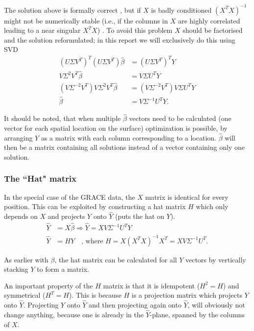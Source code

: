 The solution above is formally correct \cite[p.~12]{statistical-learning}, but if $X$ is badly conditioned $(X^T X)^{-1}$ might not be numerically stable (i.e., if the columns in $X$ are highly correlated leading to a near singular $X^T X$) \cite[p.~8]{aasbjerg-ls}.
To avoid this problem $X$ should be factorised and the solution reformulated; in this report we will exclusively do this using SVD
\begin{equation}
\begin{split}
\left( U \Sigma V^T\right)^T \left(U \Sigma V^T\right) \hat{\beta} &= \left(U \Sigma V^T\right)^T Y \\
V \Sigma^2 V^T \hat{\beta} &= V \Sigma U^T Y \\
\left(V \Sigma^{-2} V^T\right) V \Sigma^2 V^T \hat{\beta} &= \left(V \Sigma^{-2} V^T\right) V \Sigma U^T Y \\
\hat{\beta} &= V \Sigma^{-1} U^T Y.
\end{split}
\end{equation}

It should be noted, that when multiple $\hat{\beta}$ vectors need to be calculated (one vector for each spatial location on the surface) optimization is possible, by arranging $Y$ as a matrix with each column corresponding to a location.
$\hat{\beta}$ will then be a matrix containing all solutions instead of a vector containing only one solution.

\subsubsection{The ``Hat" matrix}
In the special case of the GRACE data, the $X$ matrix is identical for every position. This can be exploited by constructing a hat matrix $H$ which only depends on $X$ and projects $Y$ onto $\hat{Y}$ (puts the hat on $Y$).
\begin{equation}
\begin{split}
\hat{Y} &= X \hat{\beta} \Rightarrow \hat{Y} = X V \Sigma^{-1} U^T Y \\
\hat{Y} &= H Y \quad \text{, where } H =X(X^{T}X)^{-1}X^{T}= X V \Sigma^{-1} U^T.
\end{split}
\end{equation}

As earlier with $\beta$, the hat matrix can be calculated for all $Y$ vectors by vertically stacking $Y$ to form a matrix.

An important property of the $H$ matrix is that it is idempotent ($H^2 = H$) and symmetrical ($H^T = H$).
This is because $H$ is a projection matrix which projects $Y$ onto $\hat{Y}$.
Projecting $Y$ onto $\hat{Y}$ and then projecting again onto $\hat{Y}$, will obviously not change anything, because one is already in the $\hat{Y}$-plane, spanned by the columns of $X$.

